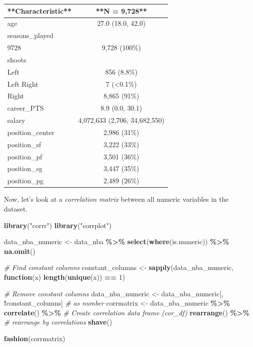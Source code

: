 \documentclass[
]{book}
\newenvironment{Shaded}{\begin{snugshade}}{\end{snugshade}}
\newcommand{\CommentTok}[1]{\textcolor[rgb]{0.56,0.35,0.01}{\textit{#1}}}
\newcommand{\ControlFlowTok}[1]{\textcolor[rgb]{0.13,0.29,0.53}{\textbf{#1}}}
\newcommand{\DecValTok}[1]{\textcolor[rgb]{0.00,0.00,0.81}{#1}}
\newcommand{\FunctionTok}[1]{\textcolor[rgb]{0.13,0.29,0.53}{\textbf{#1}}}
\newcommand{\NormalTok}[1]{#1}
\newcommand{\OtherTok}[1]{\textcolor[rgb]{0.56,0.35,0.01}{#1}}
\newcommand{\SpecialCharTok}[1]{\textcolor[rgb]{0.81,0.36,0.00}{\textbf{#1}}}
\newcommand{\StringTok}[1]{\textcolor[rgb]{0.31,0.60,0.02}{#1}}
\begin{document}
\begin{tabular}{l|c}
\hline
**Characteristic** & **N = 9,728**\\
\hline
age & 27.0 (18.0, 42.0)\\
\hline
seasons\_played & \\
\hline
9728 & 9,728 (100\%)\\
\hline
shoots & \\
\hline
Left & 856 (8.8\%)\\
\hline
Left Right & 7 (<0.1\%)\\
\hline
Right & 8,865 (91\%)\\
\hline
career\_PTS & 8.9 (0.0, 30.1)\\
\hline
salary & 4,072,633 (2,706, 34,682,550)\\
\hline
position\_center & 2,986 (31\%)\\
\hline
position\_sf & 3,222 (33\%)\\
\hline
position\_pf & 3,501 (36\%)\\
\hline
position\_sg & 3,447 (35\%)\\
\hline
position\_pg & 2,489 (26\%)\\
\hline
\end{tabular}

Now, let's look at a \emph{correlation matrix} between all numeric
variables in the dataset.

\begin{Shaded}
\begin{Highlighting}[]
\FunctionTok{library}\NormalTok{(}\StringTok{"corrr"}\NormalTok{)}
\FunctionTok{library}\NormalTok{(}\StringTok{"corrplot"}\NormalTok{)}

\NormalTok{data\_nba\_numeric }\OtherTok{\textless{}{-}}\NormalTok{ data\_nba }\SpecialCharTok{\%\textgreater{}\%}
  \FunctionTok{select}\NormalTok{(}\FunctionTok{where}\NormalTok{(is.numeric)) }\SpecialCharTok{\%\textgreater{}\%}
  \FunctionTok{na.omit}\NormalTok{()}

\CommentTok{\# Find constant columns}
\NormalTok{constant\_columns }\OtherTok{\textless{}{-}} \FunctionTok{sapply}\NormalTok{(data\_nba\_numeric, }\ControlFlowTok{function}\NormalTok{(x) }\FunctionTok{length}\NormalTok{(}\FunctionTok{unique}\NormalTok{(x)) }\SpecialCharTok{==} \DecValTok{1}\NormalTok{)}

\CommentTok{\# Remove constant columns}
\NormalTok{data\_nba\_numeric }\OtherTok{\textless{}{-}}\NormalTok{ data\_nba\_numeric[, }\SpecialCharTok{!}\NormalTok{constant\_columns]}
\CommentTok{\# as number}
\NormalTok{corrmatrix }\OtherTok{\textless{}{-}}\NormalTok{ data\_nba\_numeric }\SpecialCharTok{\%\textgreater{}\%}
  \FunctionTok{correlate}\NormalTok{() }\SpecialCharTok{\%\textgreater{}\%}    \CommentTok{\# Create correlation data frame (cor\_df)}
  \FunctionTok{rearrange}\NormalTok{() }\SpecialCharTok{\%\textgreater{}\%}  \CommentTok{\# rearrange by correlations}
  \FunctionTok{shave}\NormalTok{() }

\FunctionTok{fashion}\NormalTok{(corrmatrix)}
\end{Highlighting}
\end{Shaded}
\end{document}
